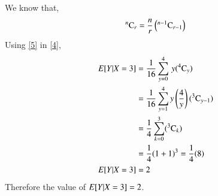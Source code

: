 \documentclass[journal,12pt,twocolumn]{IEEEtran}
\begin{document}
 We know that,
 \begin{align}
     {}^{n}\mathrm{C}_{r} = \frac{n}{r}\left({}^{n-1}\mathrm{C}_{r-1}\right)\label{5}
 \end{align}
 Using \eqref{5} in \eqref{4},
 \begin{align}
  E[ Y|X=3 ]&=\frac{1}{16}\sum_{y=0}^4\, {y({}^{4}\mathrm{C}_{y})}\\
  &=\frac{1}{16}\sum_{y=1}^{4} y\left(\frac{4}{y}\right)({}^{3}\mathrm{C}_{y-1})\\
  &=\frac{1}{4}\sum_{k=0}^{3}({}^{3}\mathrm{C}_{k})\\
  &=\frac{1}{4}(1+1)^3=\frac{1}{4}(8)\\
  E[ Y|X=3 ]&=2
\end{align}
Therefore the value of $E[ Y|X=3 ]=2$.
\end{document}
